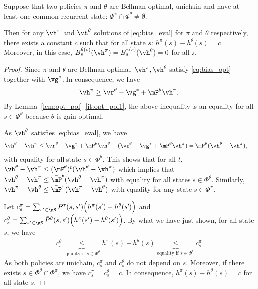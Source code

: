 \begin{lem}
    \label{lem:equi_bias}
    Suppose that two policies $\pi$ and $\theta$ are Bellman optimal, unichain and have at least one common recurrent state: $\Phi^\pi\cap\Phi^\theta\neq\emptyset$.
    
    Then for any $\vh^\pi$ and $\vh^\theta$ solutions of \eqref{eq:bias_eval} for $\pi$ and $\theta$ respectively, there exists a constant $c$ such that for all state $s$: $h^\pi(s) -h^\theta(s) =c$. Moreover, in this case, ${B_s^{\theta(s)}(\vh^\pi)=B_s^{\pi(s)}(\vh^\theta)=0}$ for all $s$.
\end{lem}
\begin{proof}
    Since $\pi$ and $\theta$ are Bellman optimal, $\vh^\pi,\vh^\theta$ satisfy \eqref{eq:bias_opt} together with $\vg^*$.
    In consequence, we have
    \begin{align*}
        \vh^\pi \ge \vr^\theta -\vg^* +\mP^\theta\vh^\pi.
    \end{align*}
    By Lemma~\ref{lem:opt_pol}~\ref{it:opt_pol1}, the above inequality is an equality for all $s\in\Phi^\theta$ because $\theta$ is gain optimal.

    As $\vh^\theta$ satisfies \eqref{eq:bias_eval}, we have
    \begin{align*}
        \vh^\theta -\vh^\pi &\le \vr^\theta -\vg^* +\mP^\theta\vh^\theta -(\vr^\theta -\vg^* +\mP^\theta\vh^\pi) = \mP^\theta(\vh^\theta -\vh^\pi),
    \end{align*}
    with equality for all state $s\in\Phi^\theta$. This shows that for all $t$, $\vh^\theta -\vh^\pi\le (\mP^\theta)^t(\vh^\theta -\vh^\pi)$ which implies that $\vh^\theta -\vh^\pi\le \bar{\mP}^\theta(\vh^\theta -\vh^\pi)$ with equality for all states $s\in\Phi^\theta$. Similarly, $\vh^\pi -\vh^\theta \le \bar{\mP}^\pi(\vh^\pi -\vh^\theta)$ with equality for any state $s\in\Phi^\pi$.

    Let $c^\pi_s=\sum_{s'\in\gS}\bar{P}^\pi(s,s')\Big(h^\pi(s')-h^\theta(s')\Big)$ and $c^\theta_s=\sum_{s'\in\gS}\bar{P}^\theta(s,s')\Big(h^\pi(s')-h^\theta(s')\Big)$. By what we have just shown, for all state $s$, we have
    \begin{align*}
        c^\theta_s \underbrace{\le}_{\text{equality if $s\in\Phi^\theta$}} h^\pi(s)-h^\theta(s) \underbrace{\le}_{\text{equality if $s\in\Phi^\pi$}} c^\pi_s
    \end{align*}
    As both policies are unichain, $c^\pi_s$ and $c^\theta_s$ do not depend on $s$.
    Moreover, if there exists $s\in\Phi^\theta\cap\Phi^\pi$, we have $c^\pi_s=c^\theta_s = c$. In consequence,  $h^\pi(s)-h^\theta(s)=c$ for all state $s$. 
\end{proof}

